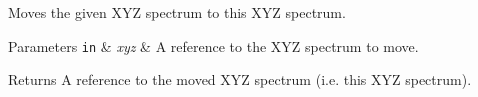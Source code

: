 Moves the given X\+YZ spectrum to this X\+YZ spectrum.


\begin{DoxyParams}[1]{Parameters}
\mbox{\tt in}  & {\em xyz} & A reference to the X\+YZ spectrum to move. \\
\hline
\end{DoxyParams}
\begin{DoxyReturn}{Returns}
A reference to the moved X\+YZ spectrum (i.\+e. this X\+YZ spectrum). 
\end{DoxyReturn}
